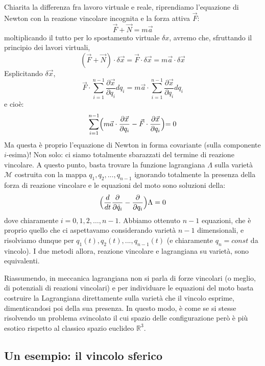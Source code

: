 \documentclass[a4paper,openany]{article}
\begin{document}
	Chiarita la differenza fra lavoro virtuale e reale, riprendiamo l'equazione di Newton con la reazione vincolare incognita e la forza attiva $\vec{F}$:
	$$
	\vec{F} + \vec{N} = m\vec{a}
	$$
	moltiplicando il tutto per lo spostamento virtuale $\delta x$, avremo che, sfruttando il principio dei lavori virtuali,
	$$
	(\vec{F} + \vec{N})\cdot\delta\vec{x} = \vec{F}\cdot\delta\vec{x} =  m\vec{a}\cdot\delta\vec{x}
	$$
	Esplicitando $\delta\vec{x}$,
	$$
	\vec{F}\cdot\sum_{i=1}^{n-1} \dfrac{\partial \vec{x}}{\partial q_{i}}dq_{i} =  m\vec{a}\cdot\sum_{i=1}^{n-1} \dfrac{\partial \vec{x}}{\partial q_{i}}dq_{i}
	$$
	e cioè:
	$$
	\sum_{i=1}^{n-1}\Bigl(m\vec{a}\cdot\dfrac{\partial \vec{x}}{\partial q_{i}} - \vec{F}\cdot\dfrac{\partial \vec{x}}{\partial q_{i}}\Bigl) = 0
	$$
	Ma questa è proprio l'equazione di Newton in forma covariante (sulla componente $i$-esima)! Non solo: ci siamo totalmente sbarazzati del termine di reazione vincolare. A questo punto, basta trovare la funzione lagrangiana $\Lambda$ sulla varietà $\mathcal{M}$ costruita con la mappa $q_1, q_2, ..., q_{n-1}$ ignorando totalmente la presenza della forza di reazione vincolare e le equazioni del moto sono soluzioni della:
	$$
	\Bigl(\dfrac{d}{dt}\dfrac{\partial}{\partial \dot{q}_i} - \dfrac{\partial }{\partial q_i}\Bigl)\Lambda = 0
	$$
	dove chiaramente $i = 0,1,2, \dots, n-1$. Abbiamo ottenuto $n-1$ equazioni, che è proprio quello che ci aspettavamo considerando varietà $n-1$ dimensionali, e risolviamo dunque per $q_1(t), q_2(t), ..., q_{n-1}(t)$ (e chiaramente $q_n = const$ da vincolo). I due metodi allora, reazione vincolare e lagrangiana su varietà, sono equivalenti.
	
	Riassumendo, in meccanica lagrangiana non si parla di forze vincolari (o meglio, di potenziali di reazioni vincolari) e per individuare le equazioni del moto basta costruire la Lagrangiana direttamente sulla varietà che il vincolo esprime, dimenticandosi poi della sua presenza. In questo modo, è come se si stesse risolvendo un problema svincolato il cui spazio delle configurazione però è più esotico rispetto al classico spazio euclideo $\mathbb{R}^{3}$.
	
	
	
	
	\subsection{ Un esempio: il vincolo sferico}
	
\end{document}

